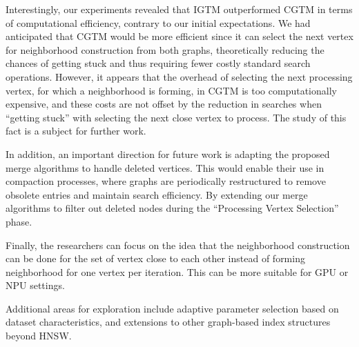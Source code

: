 \documentclass{article}
\begin{document}
Interestingly, our experiments revealed that \textsc{IGTM} outperformed \textsc{CGTM} in terms of computational efficiency, contrary to our initial expectations. We had anticipated that \textsc{CGTM} would be more efficient since it can select the next vertex for neighborhood construction from both graphs, theoretically reducing the chances of getting stuck and thus requiring fewer costly standard search operations. However, it appears that the overhead of selecting the next processing vertex, for which a neighborhood is forming, in \textsc{CGTM} is too computationally expensive, and these costs are not offset by the reduction in searches when ``getting stuck'' with selecting the next close vertex to process. The study of this fact is a subject for further work.

In addition, an important direction for future work is adapting the proposed merge algorithms to handle deleted vertices. This would enable their use in compaction processes, where graphs are periodically restructured to remove obsolete entries and maintain search efficiency. By extending our merge algorithms to filter out deleted nodes during the ``Processing Vertex Selection'' phase.

Finally, the researchers can focus on the idea that the neighborhood construction can be done for the set of vertex close to each other instead of forming neighborhood for one vertex per iteration. This can be more suitable for GPU or NPU settings.  

Additional areas for exploration include adaptive parameter selection based on dataset characteristics, and extensions to other graph-based index structures beyond HNSW. 



\end{document}
